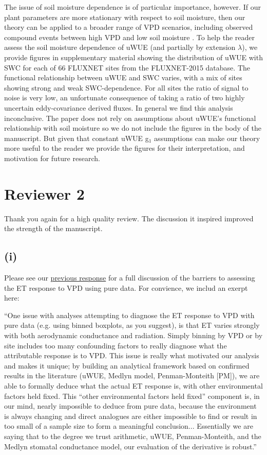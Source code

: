 \documentclass[12pt]{article}
\begin{document}
The issue of soil moisture dependence is of particular importance,
however. If our plant parameters are more stationary with respect to
soil moisture, then our theory can be applied to a broader range of
VPD scenarios, including observed compound events between high VPD and
low soil moisture \citep{Zhou_2019}. To help the reader assess the
soil moisture dependence of uWUE (and partially by extension
$\lambda$), we provide figures in supplementary material showing the
distribution of uWUE with SWC for each of 66 FLUXNET sites from the
FLUXNET-2015 database. The functional relationship between uWUE and
SWC varies, with a mix of sites showing strong and weak
SWC-dependence. For all sites the ratio of signal to noise is very
low, an unfortunate consequence of taking a ratio of two highly
uncertain eddy-covariance derived fluxes. In general we find this
analysis inconclusive. The paper does not rely on assumptions about
uWUE's functional relationship with soil moisture so we do not include
the figures in the body of the manuscript. But given that constant
uWUE g$_1$ assumptions can make our theory more useful to the reader
we provide the figures for their interpretation, and motivation for
future research.


\section{Reviewer 2}

Thank you again for a high quality review. The discussion it
inspired improved the strength of the manuscript.

\subsection{(i)}
\label{(i)}
Please see our
\href{https://www.hydrol-earth-syst-sci-discuss.net/hess-2018-553/hess-2018-553-AC2-supplement.pdf}{previous
  response} for a full discussion of the barriers to assessing the ET
response to VPD using pure data. For convience, we includ an exerpt
here:

``One issue with analyses attempting to diagnose the ET response to
VPD with pure data (e.g. using binned boxplots, as you suggest), is
that ET varies strongly with both aerodynamic conductance and
radiation. Simply binning by VPD or by site includes too many
confounding factors to really diagnose what the attributable response
is to VPD. This issue is really what motivated our analysis and makes
it unique; by building an analytical framework based on confirmed
results in the literature (uWUE, Medlyn model, Penman-Monteith [PM]),
we are able to formally deduce what the actual ET response is, with
other environmental factors held fixed. This ``other environmental
factors held fixed'' component is, in our mind, nearly impossible to
deduce from pure data, because the environment is always changing and
direct analogues are either impossible to find or result in too small
of a sample size to form a meaningful conclusion... Essentially we are
saying that to the degree we trust arithmetic, uWUE, Penman-Monteith,
and the Medlyn stomatal conductance model, our evaluation of the
derivative is robust.''
\end{document}
